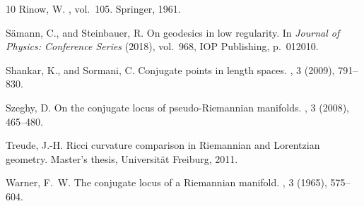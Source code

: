 \documentclass[a4paper,11pt]{article}
\numberwithin{equation}{section}
\theoremstyle{plain}
\theoremstyle{definition}
\begin{document}
\begin{thebibliography}{10}
{\sc Rinow, W.}
, vol.~105.
\newblock Springer, 1961.

{\sc S{\"a}mann, C., and Steinbauer, R.}
\newblock On geodesics in low regularity.
\newblock In {\em Journal of Physics: Conference Series\/} (2018), vol.~968,
 IOP Publishing, p.~012010.

{\sc Shankar, K., and Sormani, C.}
\newblock Conjugate points in length spaces.
, 3 (2009), 791--830.

{\sc Szeghy, D.}
\newblock On the conjugate locus of pseudo-{R}iemannian manifolds.
, 3 (2008), 465--480.

{\sc Treude, J.-H.}
\newblock Ricci curvature comparison in {Riemannian} and {Lorentzian} geometry.
\newblock Master's thesis, Universität Freiburg, 2011.

{\sc Warner, F.~W.}
\newblock The conjugate locus of a {R}iemannian manifold.
, 3 (1965), 575--604.

\end{thebibliography}
\end{document}
